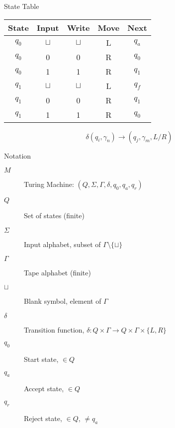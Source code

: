 \documentclass[dvipsnames, hidelinks]{beamer}
\begin{document}
\begin{frame}{State Table}
  \begin{table}
    \centering
    \begin{tabular}{cc|ccc}
    \toprule
        State & Input & Write & Move & Next \\
    \midrule
        $q_0$ & $\sqcup$ & $\sqcup$ & L & $q_a$ \\
        $q_0$ & 0 & 0 & R & $q_0$ \\
        $q_0$ & 1 & 1 & R & $q_1$ \\
    \midrule
        $q_1$ & $\sqcup$ & $\sqcup$ & L & $q_f$ \\
        $q_1$ & 0 & 0 & R & $q_1$ \\
        $q_1$ & 1 & 1 & R & $q_0$ \\
    \bottomrule
    \end{tabular}
  \end{table}
  

  \[ \delta(q_i, \gamma_n) \rightarrow (q_j, \gamma_m, L/R) \]
\end{frame}



\begin{frame}{Notation}


\begin{description}
  \item[$M$] Turing Machine: $(Q, \Sigma, \Gamma, \delta , q_0, q_a, q_r )$
  \vspace{4mm}
  \item[$Q$] Set of states (finite)
  \item[$\Sigma$] Input alphabet, subset of $\Gamma \setminus \{ \sqcup \} $
  \item[$\Gamma$] Tape alphabet (finite)
  \item[$\sqcup$] Blank symbol, element of $\Gamma$
  \item[$\delta$] Transition function, $\delta: Q \times \Gamma \rightarrow Q \times \Gamma \times \{L,R\}$
  \item[$q_0$] Start state, $\in Q$
  \item[$q_a$] Accept state, $\in Q$
  \item[$q_r$] Reject state, $\in Q$, $\neq q_a$
\end{description}
\end{frame}
\end{document}
